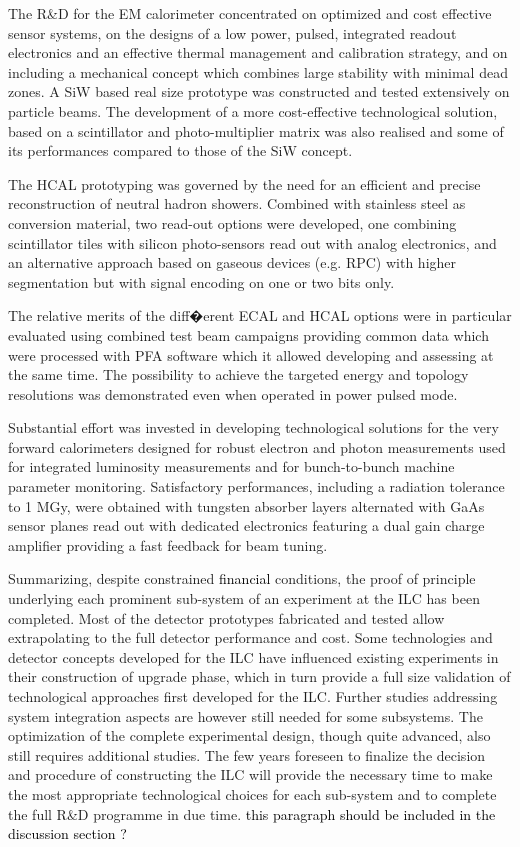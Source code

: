 \documentclass[%
 reprint,
 amsmath,amssymb,
 aps,
]{revtex4-1}
\newcommand{\jim}[1]{\textcolor{black}{#1}}
\newcommand{\todo}[1]{\textcolor{black}{{#1}}}
\begin{document}
The R\&D for the EM calorimeter concentrated on optimized and cost effective sensor systems, on the designs of a low power, pulsed, integrated readout electronics and an effective thermal management and calibration strategy, and on including a mechanical concept which combines large stability with minimal dead zones. A SiW based real size prototype was constructed and tested extensively on particle beams. The development of a more cost-effective technological solution, based on a scintillator and photo-multiplier matrix was also realised and some of its performances compared to those of the SiW concept.

The HCAL prototyping was governed by the need for an efficient and precise reconstruction of neutral hadron showers. Combined with stainless steel as conversion material, two read-out options were developed, one combining scintillator tiles with silicon photo-sensors read out with analog electronics, and an alternative approach based on gaseous devices (e.g. RPC) with higher segmentation but with signal encoding on one or two bits only.

The relative merits of the diff�erent ECAL and HCAL options were in particular evaluated using combined test beam campaigns providing common data which were processed with PFA software which it allowed developing and assessing at the same time. The possibility to achieve the targeted energy and topology resolutions was demonstrated even when operated in power pulsed mode.

Substantial effort was invested in developing technological solutions for the very forward calorimeters designed for robust electron and photon measurements used for integrated luminosity measurements and for bunch-to-bunch machine parameter monitoring. Satisfactory performances, including a radiation tolerance to 1 MGy, were obtained with tungsten absorber layers alternated with GaAs sensor planes read out with dedicated electronics featuring a dual gain charge amplifier providing a fast feedback for beam tuning.

Summarizing, despite constrained \jim{financial} conditions, the proof of principle underlying each prominent sub-system of an experiment at the ILC has been completed. Most of the detector prototypes fabricated and tested allow extrapolating to the full detector performance and cost. Some technologies and detector concepts developed for the ILC have influenced existing experiments in their construction of upgrade phase, which in turn provide a full size validation of technological approaches ﬁrst developed for the ILC. Further studies addressing system integration aspects are however still needed for some subsystems. The optimization of the complete experimental design, though quite advanced, also still requires additional studies. The few years foreseen to finalize the decision and procedure of constructing the ILC will provide the necessary time to make the most appropriate technological choices for each sub-system and to complete the full R\&D programme in due time. \todo{this paragraph should be included in the discussion section ?}
\end{document}
